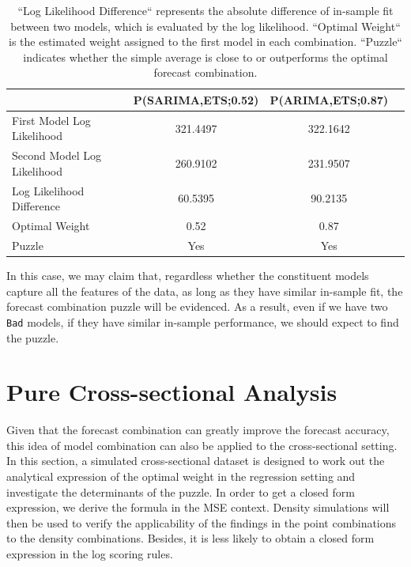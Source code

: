 \documentclass{monashthesis}
\begin{document}
\begin{table}[ht]
  \centering
    \begin{tabular}{l|ccc}
    \toprule
                                      &   P(SARIMA,ETS;0.52)   &   P(ARIMA,ETS;0.87)  \\  
    \midrule
    First Model Log Likelihood        &         321.4497       &        322.1642     \\
    Second Model Log Likelihood       &         260.9102       &        231.9507     \\
    Log Likelihood Difference         &         60.5395        &        90.2135      \\
    Optimal Weight                    &           0.52         &          0.87       \\
    Puzzle                            &           Yes          &          Yes        \\
    \bottomrule
    \end{tabular}
  \caption{``Log Likelihood Difference`` represents the absolute difference of in-sample fit between two models, which is evaluated by the log likelihood. ``Optimal Weight`` is the estimated weight assigned to the first model in each combination. ``Puzzle`` indicates whether the simple average is close to or outperforms the optimal forecast combination.}
  \label{tab:season}
\end{table}

In this case, we may claim that, regardless whether the constituent models capture all the features of the data, as long as they have similar in-sample fit, the forecast combination puzzle will be evidenced. As a result, even if we have two \texttt{Bad} models, if they have similar in-sample performance, we should expect to find the puzzle.

\hypertarget{pure-cross-sectional-analysis}{%
\chapter{Pure Cross-sectional Analysis}\label{pure-cross-sectional-analysis}}

Given that the forecast combination can greatly improve the forecast accuracy, this idea of model combination can also be applied to the cross-sectional setting. In this section, a simulated cross-sectional dataset is designed to work out the analytical expression of the optimal weight in the regression setting and investigate the determinants of the puzzle. In order to get a closed form expression, we derive the formula in the MSE context. Density simulations will then be used to verify the applicability of the findings in the point combinations to the density combinations. Besides, it is less likely to obtain a closed form expression in the log scoring rules.
\end{document}
